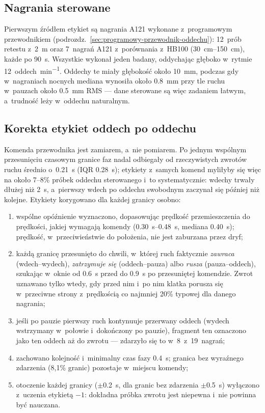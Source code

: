 \documentclass[12pt,a4paper,oneside]{report}
\begin{document}
\subsection{Nagrania sterowane}
Pierwszym źródłem etykiet są nagrania A121 wykonane z~programowym
przewodnikiem (podrozdz.~\ref{sec:programowy-przewodnik-oddechu}): 12~prób
retestu z~\SI{2}{m} oraz 7~nagrań A121 z~porównania z~HB100
(\SIrange{30}{150}{cm}), każde po \SI{90}{s}. Wszystkie wykonał jeden badany,
oddychając głęboko w~rytmie \SI{12}{oddech\per\minute}. Oddechy te miały
głębokość około \SI{10}{mm}, podczas gdy w~nagraniach nocnych mediana
wynosiła około \SI{0.8}{mm} przy tle ruchu w~pauzach około \SI{0.5}{mm}
RMS --- dane sterowane są więc zadaniem łatwym, a~trudność leży w~oddechu
naturalnym.

\subsection{Korekta etykiet oddech po oddechu}
\label{sec:sieci-korekta}
Komenda przewodnika jest zamiarem, a~nie pomiarem. Po jednym wspólnym
przesunięciu czasowym granice faz nadal odbiegały od rzeczywistych zwrotów
ruchu średnio o~\SI{0.21}{s} (IQR \SI{0.28}{s}); etykiety z~samych komend
myliłyby się więc na około 7--8\% próbek oddechu sterowanego i~to
systematycznie: wdechy trwały dłużej niż \SI{2}{s}, a~pierwszy wdech po
oddechu swobodnym zaczynał się później niż kolejne. Etykiety korygowano
dla każdej granicy osobno:
\begin{enumerate}
  \item wspólne opóźnienie wyznaczono, dopasowując prędkość przemieszczenia
  do prędkości, jakiej wymagają komendy (\SIrange{0.30}{0.48}{s}, mediana
  \SI{0.40}{s}); prędkość, w~przeciwieństwie do położenia, nie jest
  zaburzana przez dryf;
  \item każdą granicę przesunięto do chwili, w~której ruch faktycznie
  \emph{zawraca} (wdech--wydech), \emph{zatrzymuje się} (oddech--pauza) albo
  \emph{rusza} (pauza--oddech), szukając w~oknie od \SI{0.6}{s} przed do
  \SI{0.9}{s} po przesuniętej komendzie. Zwrot uznawano tylko wtedy, gdy
  przed nim i~po nim klatka porusza się w~przeciwne strony z~prędkością co
  najmniej 20\% typowej dla danego nagrania;
  \item jeśli po pauzie pierwszy ruch kontynuuje przerwany oddech (wydech
  wstrzymany w~połowie i~dokończony po pauzie), fragment ten oznaczono jako
  ten oddech aż do zwrotu --- zdarzyło się to w~8~z~19~nagrań;
  \item zachowano kolejność i~minimalny czas fazy \SI{0.4}{s}; granica bez
  wyraźnego zdarzenia (8,1\% granic) pozostaje w~miejscu komendy;
  \item otoczenie każdej granicy ($\pm$\SI{0.2}{s}, dla granic bez zdarzenia
  $\pm$\SI{0.5}{s}) wyłączono z~uczenia etykietą $-1$: dokładna próbka
  zwrotu jest niepewna i~nie powinna być nauczana.
\end{enumerate}
\end{document}
